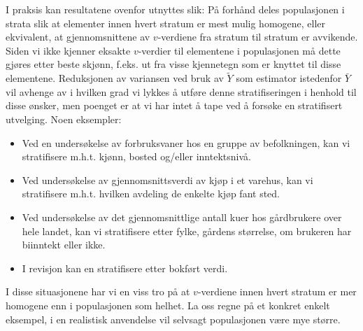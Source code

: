 I praksis kan resultatene ovenfor utnyttes slik:  På forhånd deles
po\-pu\-la\-sjonen i strata slik at elementer innen hvert stratum er mest
mulig homogene, eller ekvivalent, at gjennomsnittene av $v$-verdiene fra
stratum til stratum er avvikende. Siden vi ikke kjenner eksakte $v$-verdier
til elementene i populasjonen må dette gjøres etter beste skjønn, 
f.eks. ut fra visse kjennetegn som er knyttet til disse elementene. Reduksjonen
av varian\-sen ved bruk av $\tilde{Y}$ som estimator istedenfor $\bar{Y}$ vil
avhenge av i hvilken grad vi lykkes å utføre denne stratifiseringen
i henhold til disse ønsker, men poenget er at vi har intet å tape ved
å forsøke en stratifisert utvelging.  Noen eksempler:

\begin{itemize}
\item  Ved en undersøkelse av forbruksvaner hos en gruppe av befolkningen,
       kan vi stratifisere m.h.t. kjønn, bosted og/eller inntektsnivå.
\item  Ved undersøkelse av gjennomsnittsverdi av kjøp i et varehus, kan
       vi stratifisere m.h.t. hvilken avdeling de enkelte kjøp fant sted.
\item  Ved undersøkelse av det gjennomsnittlige antall kuer hos 
       gårdbrukere over hele landet, kan vi stratifisere etter fylke, 
       gårdens størrelse, om brukeren har biinntekt eller ikke.
\item  I revisjon kan en stratifisere etter bokført verdi.
\end{itemize} 

\noindent I disse situasjonene har vi en viss tro på at $v$-verdiene innen
hvert stratum er mer homogene enn i populasjonen som helhet.  La oss regne
på et konkret enkelt eksempel, i en realistisk anvendelse vil selvsagt
populasjonen være mye større.\\

